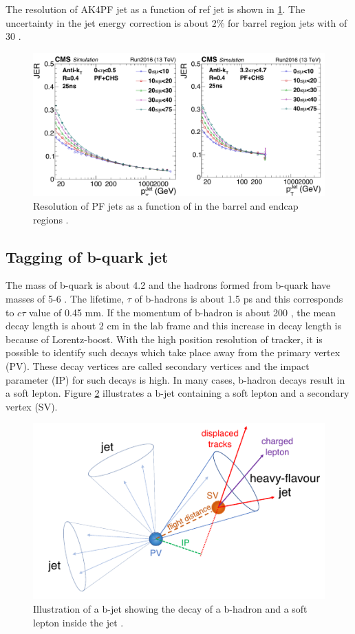 The resolution of AK4PF jet as a function of ref jet is shown in \ref{fig:JER_2016}. The uncertainty in the jet energy correction is about 
2\% for barrel region jets with \pt of 30 \gev \cite{CMS-DP-2018-028}.
\begin{figure}[h!]
\centering
\includegraphics[width=0.8\linewidth]{../Figures/Chap2/JER_2016}
\captionsetup{width=.9\linewidth}
\caption[AK4PF jet energy resolution]{Resolution of PF jets as a function of \pt in the barrel and endcap regions \cite{CMS-DP-2016-020}.}
\label{fig:JER_2016}
\end{figure}
\subsection{Tagging of b-quark jet}
The mass of b-quark is about 4.2 \gev and the hadrons formed from b-quark have masses of 5-6 \gev. The lifetime, $\tau$ of b-hadrons is 
about 1.5 ps and this corresponds to $c\tau$ value of 0.45 mm. If the momentum of b-hadron is about 200 \gev, the mean decay length is 
about 2 cm in the lab frame and this increase in decay length is because of Lorentz-boost. With the high position resolution of tracker, 
it is possible to identify such decays which take place away from the primary vertex (PV). These decay vertices are called secondary 
vertices and the impact parameter (IP) for such decays is high. In many cases, b-hadron decays result in a soft lepton. Figure 
\ref{fig:bJet} illustrates a b-jet containing a soft lepton and a secondary vertex (SV).
\begin{figure}[h!]
\centering
\includegraphics[width=0.7\linewidth]{../Figures/Chap2/bJet}
\caption[b-jet showing b-hadron decays]{Illustration of a b-jet showing the decay of a b-hadron and a soft lepton inside the jet \cite{BTV-16-002}.}
\label{fig:bJet}
\end{figure}

